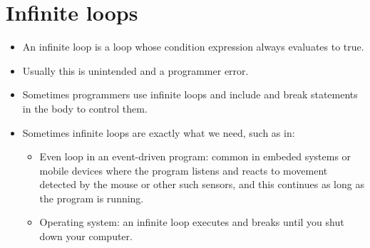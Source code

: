 \section{Infinite loops}
\begin{itemize}
    \item An infinite loop is a loop whose condition expression always evaluates to true.
    \item Usually this is unintended and a programmer error.
    \item Sometimes programmers use infinite loops and include and break statements in the body to control them.
    \item Sometimes infinite loops are exactly what we need, such as in:
        \begin{itemize}
            \item Even loop in an event-driven program: common in embeded systems or mobile devices where the program listens and reacts to movement detected by the mouse or other such sensors, and this continues as long as the program is running.
            \item Operating system: an infinite loop executes and breaks until you shut down your computer.
        \end{itemize}
\end{itemize}

